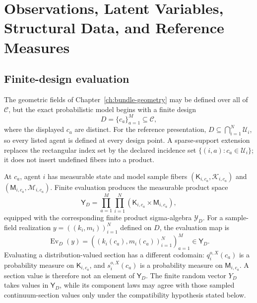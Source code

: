 \chapter[Observations, Latent Variables, Structural Data, and Reference Measures]{Observations, Latent Variables,\\Structural Data, and Reference Measures}
\label{ch:probability-semantics}

\section{Finite-design evaluation}

The geometric fields of Chapter~\ref{ch:bundle-geometry} may be defined over all of \(\mathcal C\), but the exact probabilistic model begins with a finite design
\begin{equation}
D=\{c_a\}_{a=1}^{M}\subseteq\mathcal C,
\label{eq:finite-design}
\end{equation}
where the displayed \(c_a\) are distinct. For the reference presentation, \(D\subseteq\bigcap_{i=1}^{N}\mathcal U_i\), so every listed agent is defined at every design point. A sparse-support extension replaces the rectangular index set by the declared incidence set \(\{(i,a):c_a\in\mathcal U_i\}\); it does not insert undefined fibers into a product.

At \(c_a\), agent \(i\) has measurable state and model sample fibers \((\mathsf K_{i,c_a},\mathscr K_{i,c_a})\) and \((\mathsf M_{i,c_a},\mathscr M_{i,c_a})\). Finite evaluation produces the measurable product space
\begin{equation}
\mathsf Y_D
=\prod_{a=1}^{M}\prod_{i=1}^{N}
\left(\mathsf K_{i,c_a}\times\mathsf M_{i,c_a}\right),
\label{eq:finite-population-sample-space}
\end{equation}
equipped with the corresponding finite product sigma-algebra \(\mathscr Y_D\). For a sample-field realization \(y=((k_i,m_i))_{i=1}^{N}\) defined on \(D\), the evaluation map is
\begin{equation}
\operatorname{Ev}_D(y)
=\left((k_i(c_a),m_i(c_a))_{i=1}^{N}\right)_{a=1}^{M}
\in\mathsf Y_D.
\label{eq:sample-evaluation-map}
\end{equation}
Evaluating a distribution-valued section has a different codomain: \(q_i^{o,X}(c_a)\) is a probability measure on \(\mathsf K_{i,c_a}\), and \(s_i^{o,X}(c_a)\) is a probability measure on \(\mathsf M_{i,c_a}\). A section value is therefore not an element of \(\mathsf Y_D\). The finite random vector \(Y_D\) takes values in \(\mathsf Y_D\), while its component laws may agree with those sampled continuum-section values only under the compatibility hypothesis stated below.

